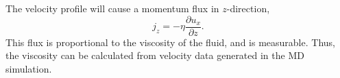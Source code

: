 The velocity profile will cause a momentum flux in $z$-direction,
\begin{equation}
    \label{eq:momentum_flux}
    j_z = -\eta \frac{\partial u_x}{\partial z}.
\end{equation}
This flux is proportional to the viscosity of the fluid, and is measurable.
Thus, the viscosity can be calculated from velocity data generated in the 
MD simulation.

